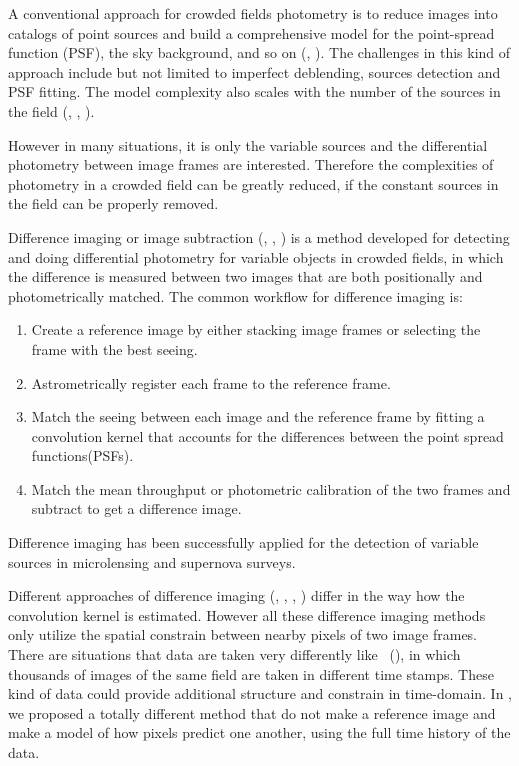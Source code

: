 A conventional approach for crowded fields photometry is to reduce images into catalogs of point sources and build a comprehensive model for the point-spread function (PSF),  the sky background, and so on (\citealt{psf1}, \citealt{psf2}).
The challenges in this kind of approach include but not limited to imperfect deblending, sources detection and PSF fitting.
The model complexity also scales with the number of the sources in the field (\citealt{crowd1}, \citealt{crowd2}, \citealt{crowd3}).

However in many situations, it is only the variable sources and the differential photometry between image frames are interested.
Therefore the complexities of photometry in a crowded field can be greatly reduced, if the constant sources in the field can be properly removed.

Difference imaging or image subtraction (\citealt{imagesub1}, \citealt{alard}, \citealt{varyingkernel}) is a method developed for detecting and doing differential photometry for variable objects in crowded fields, in which the difference is measured between two images that are both positionally and photometrically matched.
The common workflow for difference imaging is:
\begin{enumerate}
\item
Create a reference image by either stacking image frames or selecting the frame with the best seeing.
\item
Astrometrically register each frame to the reference frame.
\item
Match the seeing between each image and the reference frame by fitting a convolution kernel that accounts for the differences between the point spread functions(PSFs).
\item
Match the mean throughput or photometric calibration of the two frames and subtract to get a difference image.
\end{enumerate}
Difference imaging has been successfully applied for the detection of variable sources in microlensing \citep{macho, ogle} and supernova \citep{sdss} surveys.

Different approaches of difference imaging (\citealt{imagesub1}, \citealt{alard}, \citealt{varyingkernel}, \citealt{bramich}) differ in the way how the convolution kernel is estimated.
However all these difference imaging methods only utilize the spatial constrain between nearby pixels of two image frames.
There are situations that data are taken very differently like \ktwo\ (\citealt{k2}), in which thousands of images of the same field are taken in different time stamps.
These kind of data could provide additional structure and constrain in time-domain.
In , we proposed a totally different method that do not make a reference image and make a model of how pixels predict one another, using the full time history of the data.

